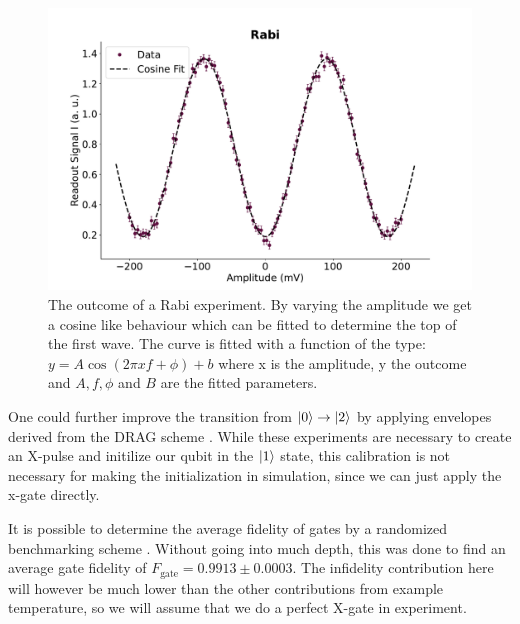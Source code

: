 \begin{figure}
    \centering
    \includegraphics{Calibrations/Figures/Rabi.pdf}
    \caption{The outcome of a Rabi experiment. By varying the amplitude we get a cosine like behaviour which can be fitted to determine the top of the first wave. The curve is fitted with a function of the type: $y = A \cos(2 \pi x f + \phi) + b$ where x is the amplitude, y the outcome and $A, f, \phi$ and $B$ are the fitted parameters.}
    \label{fig:calibration_rabi}
\end{figure}

One could further improve the transition from $\ket{0}\to\ket{2}$ by applying envelopes derived from the DRAG scheme \cite{motzoi_simple_2009}. While these experiments are necessary to create an X-pulse and initilize our qubit in the $\ket{1}$ state, this calibration is not necessary for making the initialization in simulation, since we can just apply the x-gate directly. 

It is possible to determine the average fidelity of gates by a randomized benchmarking scheme \cite{Knil}. Without going into much depth, this was done to find an average gate fidelity of $F_{\text{gate}} = 0.9913 \pm 0.0003$. The infidelity contribution here will however be much lower than the other contributions from example temperature, so we will assume that we do a perfect X-gate in experiment. 


